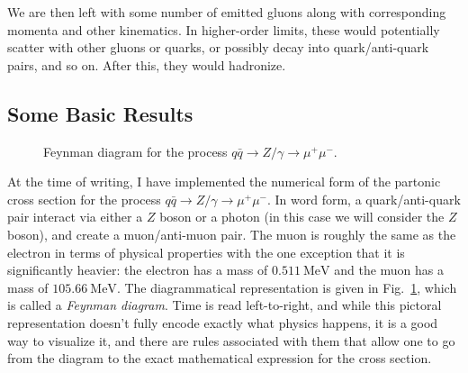 We are then left with some number of emitted gluons along with corresponding momenta and other kinematics. In higher-order limits, these would potentially scatter with other gluons or quarks, or possibly decay into quark/anti-quark pairs, and so on. After this, they would hadronize.


\subsection{Some Basic Results}

\begin{figure}[ht]
  \centering
  \caption{Feynman diagram for the process $q\bar{q} \rightarrow Z/\gamma \rightarrow \mu^+\mu^-$.}
  \label{fig:gg2Zg2mumu}
\end{figure}

At the time of writing, I have implemented the numerical form of the partonic cross section for the process $q\bar{q} \rightarrow Z/\gamma \rightarrow \mu^+\mu^-$. In word form, a quark/anti-quark pair interact via either a $Z$ boson or a photon (in this case we will consider the $Z$ boson), and create a muon/anti-muon pair. The muon is roughly the same as the electron in terms of physical properties with the one exception that it is significantly heavier: the electron has a mass of $\qty{0.511}{\mega\electronvolt}$ and the muon has a mass of $\qty{105.66}{\mega\electronvolt}$. The diagrammatical representation is given in Fig.~\ref{fig:gg2Zg2mumu}, which is called a \textit{Feynman diagram}. Time is read left-to-right, and while this pictoral representation doesn't fully encode exactly what physics happens, it is a good way to visualize it, and there are rules associated with them that allow one to go from the diagram to the exact mathematical expression for the cross section.

